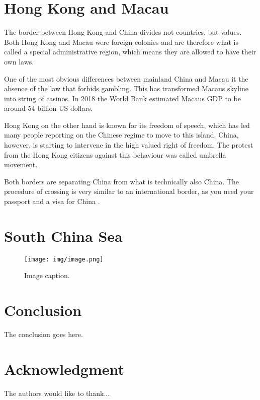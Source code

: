 \documentclass[conference]{IEEEtran}
\begin{document}
	\section{Hong Kong and Macau}
	The border between Hong Kong and China divides not countries, but values. Both Hong Kong and Macau were foreign colonies and are therefore what is called a special administrative region, which means they are allowed to have their own laws.
	
	One of the most obvious differences between mainland China and Macau it the absence of the law that forbids gambling. This has transformed Macaus skyline into string of casinos. In 2018 the World Bank estimated Macaus GDP to be around 54 billion US dollars.
	
	Hong Kong on the other hand is known for its freedom of speech, which has led many people reporting on the Chinese regime to move to this island. China, however, is starting to intervene in the high valued right of freedom. The protest from the Hong Kong citizens against this behaviour was called umbrella movement.
	
	Both borders are separating China from what is technically also China. The procedure of crossing is very similar to an international border, as you need your passport and a visa for China\cite{macauLifestyle_macauZhuhaiTheUltimateBorderCrossingGuide} \cite{yp_chinaIsErasingItsBorderWithHongKong}.
	
	\section{South China Sea}
	
	\begin{figure}[t]
		\centering
		\texttt{[image: img/image.png]}
		\caption{Image caption.}
		\label{pic:image}
	\end{figure}
	
	\section{Conclusion}
	The conclusion goes here.
	
	\section*{Acknowledgment}
	The authors would like to thank...
	
	
	
\end{document}
